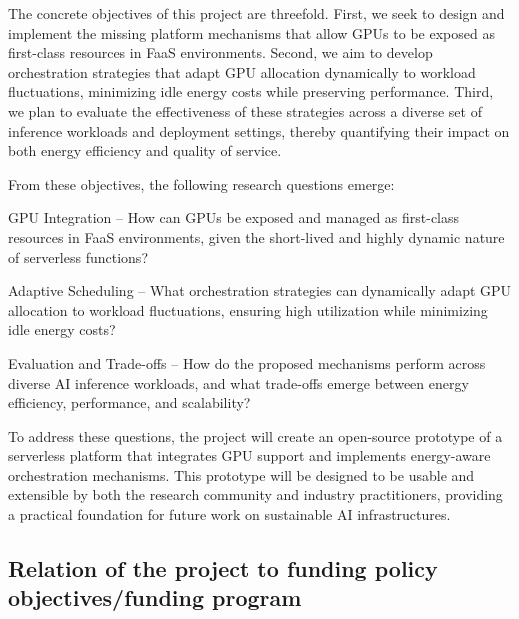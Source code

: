 The concrete objectives of this project are threefold. First, we seek to design and implement the missing platform mechanisms that allow GPUs to be exposed as first-class resources in FaaS environments. Second, we aim to develop orchestration strategies that adapt GPU allocation dynamically to workload fluctuations, minimizing idle energy costs while preserving performance. Third, we plan to evaluate the effectiveness of these strategies across a diverse set of inference workloads and deployment settings, thereby quantifying their impact on both energy efficiency and quality of service.

From these objectives, the following research questions emerge:

GPU Integration – How can GPUs be exposed and managed as first-class resources in FaaS environments, given the short-lived and highly dynamic nature of serverless functions?

Adaptive Scheduling – What orchestration strategies can dynamically adapt GPU allocation to workload fluctuations, ensuring high utilization while minimizing idle energy costs?

Evaluation and Trade-offs – How do the proposed mechanisms perform across diverse AI inference workloads, and what trade-offs emerge between energy efficiency, performance, and scalability?

To address these questions, the project will create an open-source prototype of a serverless platform that integrates GPU support and implements energy-aware orchestration mechanisms. This prototype will be designed to be usable and extensible by both the research community and industry practitioners, providing a practical foundation for future work on sustainable AI infrastructures.


\subsection{Relation of the project to funding policy objectives/funding program}


